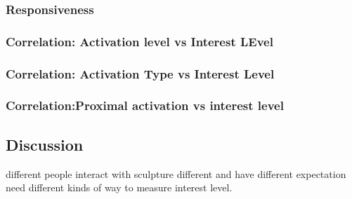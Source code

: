 \subsubsection{Responsiveness}

\subsubsection{Correlation: Activation level vs Interest LEvel}

\subsubsection{Correlation: Activation Type vs Interest Level}
\subsubsection{Correlation:Proximal activation vs interest level}



\subsection{Discussion}

different people interact with sculpture different and have different expectation
need different kinds of way to measure interest level. 



